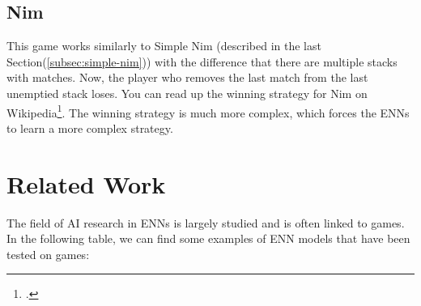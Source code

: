 \documentclass[11pt]{report}
\begin{document}
\begin{enumerate}
    \subsection{Nim}\label{subsec:nim}
    This game works similarly to Simple Nim (described in the last Section(\ref{subsec:simple-nim})) with the difference that there are multiple stacks with matches.
    Now, the player who removes the last match from the last unemptied stack loses.
    You can read up the winning strategy for Nim on Wikipedia\footcite{nim_23}.
    The winning strategy is much more complex, which forces the ENNs to learn a more complex strategy.
    \section{Related Work}\label{sec:related-work}
    The field of AI research in ENNs is largely studied and is often linked to games.
    In the following table, we can find some examples of ENN models that have been tested on games:


\end{enumerate}
\end{document}
